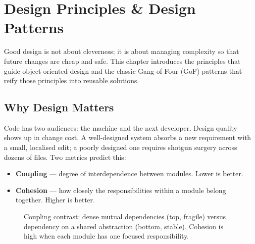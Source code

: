 \chapter{Design Principles \& Design Patterns}
\label{ch:design}

Good design is not about cleverness; it is about managing complexity so that future changes are cheap and safe. This chapter introduces the principles that guide object-oriented design and the classic Gang-of-Four (GoF) patterns that reify those principles into reusable solutions.

\section{Why Design Matters}

Code has two audiences: the machine and the next developer. Design quality shows up in change cost. A well-designed system absorbs a new requirement with a small, localised edit; a poorly designed one requires shotgun surgery across dozens of files. Two metrics predict this:

\begin{itemize}
    \item \textbf{Coupling} --- degree of interdependence between modules. Lower is better.
    \item \textbf{Cohesion} --- how closely the responsibilities within a module belong together. Higher is better.
\end{itemize}

\begin{figure}[h]
\centering
{}
\caption{Coupling contrast: dense mutual dependencies (top, fragile) versus dependency on a shared abstraction (bottom, stable). Cohesion is high when each module has one focused responsibility.}
\end{figure}

